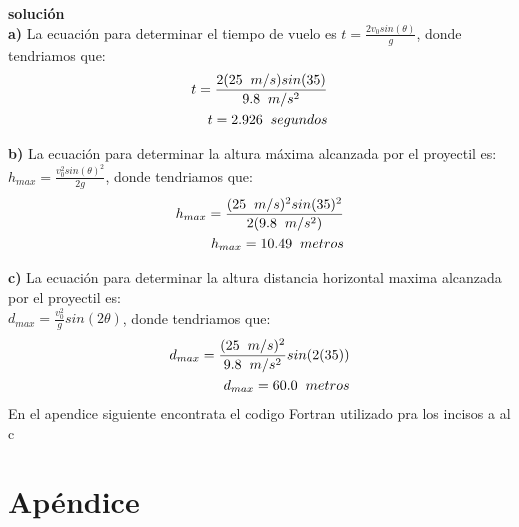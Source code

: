 \documentclass[12pt,a4paper]{article}
\begin{document}
\textbf{solución }\\
\textbf{a)} La ecuación para determinar el tiempo de vuelo es $t = \frac{2v_{0}sin (\theta)}{g}$, donde tendriamos que:\\
\begin{eqnarray}
t = \frac{2 (25\hspace{0.2cm} m/s) sin (35)}{9.8\hspace{0.2cm} m/s^{2}}\nonumber\\ 
t = 2.926\hspace{0.2cm}  segundos \nonumber
\end{eqnarray}

\textbf{b)} La ecuación para determinar la altura máxima alcanzada por el proyectil es:\\ $h_{max}=\frac{v_{0}^2 sin(\theta)^2}{2g} $, donde tendriamos que:\\
\begin{eqnarray}
h_{max}=\frac{(25\hspace{0.2cm} m/s)^2 sin(35)^2}{2(9.8\hspace{0.2cm} m/s^{2})} \nonumber\\ 
h_{max} = 10.49\hspace{0.2cm}  metros\nonumber
\end{eqnarray}

\textbf{c)} La ecuación para determinar la altura distancia horizontal maxima alcanzada por el proyectil es:\\ $d_{max} = \frac{v_0^2}{g}sin(2\theta) $, donde tendriamos que:\\
\begin{eqnarray}
d_{max} = \frac{(25\hspace{0.2cm} m/s)^2}{9.8\hspace{0.2cm} m/s^{2}}sin(2(35))\nonumber\\ 
d_{max} = 60.0 \hspace{0.2cm} metros\nonumber
\end{eqnarray}
En el apendice siguiente encontrata el codigo Fortran utilizado pra los incisos a al c
\newpage
\section{Apéndice}
\end{document}

